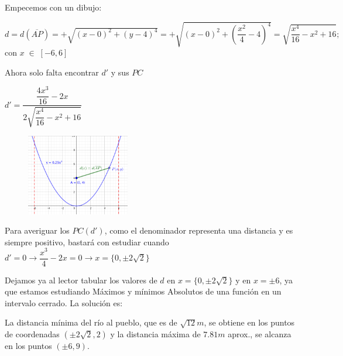 	\begin{proofw}\renewcommand{\qedsymbol}{$\diamond$}	
	Empecemos con un dibujo:
	
	
	
	\begin{multicols}{2}
	
	$d=d(\overline{AP})= +\sqrt{(x-0)^2+(y-4)^4}=+\sqrt{(x-0)^2+(\dfrac {x^2}{4}-4)^4}=\sqrt{\dfrac {x^4}{16}-x^2+16}; \quad$ con $x\; \in \; [-6,6]$
	
	Ahora solo falta encontrar $d'$ y sus $PC$
	
	$d'=\dfrac {\dfrac {4x^3}{16}-2x}{2\sqrt{\dfrac {x^4}{16}-x^2+16}}$
	
	
		\begin{figure}[H]
			\centering
			\includegraphics[width=0.4\textwidth]{imagenes/imagenes05/T05IM50.png}
		\end{figure}
	\end{multicols}
	Para averiguar los $PC(d')$, como el denominador representa una distancia y es siempre positivo, bastará con estudiar cuando $d'=0 \to \dfrac {x^3}{4}-2x=0 \to x=\{0, \pm 2\sqrt{2}\}$
	
	Dejamos ya al lector tabular los valores de $d$ en $x=\{0, \pm 2\sqrt{2}\}$ y en $x=\pm 6$, ya que estamos estudiando Máximos y mínimos Absolutos de una función en un intervalo cerrado. La solución es:
	
	La distancia mínima del río al pueblo, que es de $\sqrt{12}m$, se obtiene en los puntos de coordenadas $(\pm2\sqrt{2},2)$ y la distancia máxima de $7.81 m$ aprox., se alcanza en los puntos $(\pm 6,9)$.
	
	
	
	\end{proofw}
	
